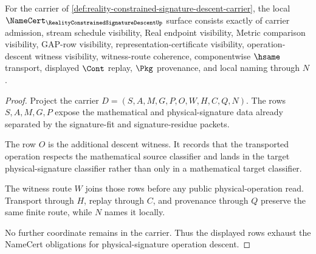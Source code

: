 \begin{theorem}
\label{thm:reality-constrained-signature-descent-namecert-obligations}
For the carrier of \autoref{def:reality-constrained-signature-descent-carrier}, the local $\NameCert_{\RealityConstrainedSignatureDescentUp}$ surface consists exactly of carrier admission, stream schedule visibility, Real endpoint visibility, Metric comparison visibility, GAP-row visibility, representation-certificate visibility, operation-descent witness visibility, witness-route coherence, componentwise $\hsame$ transport, displayed $\Cont$ replay, $\Pkg$ provenance, and local naming through $N$.
\end{theorem}
\begin{proof}
Project the carrier $D=(S,A,M,G,P,O,W,H,C,Q,N)$. The rows $S,A,M,G,P$ expose the mathematical and physical-signature data already separated by the signature-fit and signature-residue packets.

The row $O$ is the additional descent witness. It records that the transported operation respects the mathematical source classifier and lands in the target physical-signature classifier rather than only in a mathematical target classifier.

The witness route $W$ joins those rows before any public physical-operation read. Transport through $H$, replay through $C$, and provenance through $Q$ preserve the same finite route, while $N$ names it locally.

No further coordinate remains in the carrier. Thus the displayed rows exhaust the NameCert obligations for physical-signature operation descent.
\end{proof}

